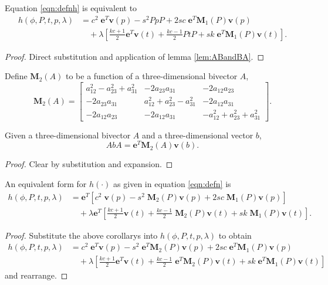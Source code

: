 \begin{cor}
Equation \ref{eqn:defnh} is equivalent to
\begin{align*}
h(\phi, P, t, p, \lambda) &= c^2\;\mathbf{e}^T\mathbf{v}(p) - s^2PpP + 2sc\;\mathbf{e}^T\mathbf{M}_1(P)\mathbf{v}(p) \\
&\quad+ \lambda\left[ 
 \frac{kc+1}{2} \mathbf{e}^T\mathbf{v}(t) + \frac{kc-1}{2} PtP
+ sk\;\mathbf{e}^T\mathbf{M}_1(P)\mathbf{v}(t)
\right].
\end{align*}
\begin{proof}
Direct substitution and application of lemma \ref{lem:ABandBA}.
\end{proof}
\end{cor}

\begin{definition}
Define $\mathbf{M}_2(A)$ to be a function of a three-dimensional bivector $A$,
\[
\mathbf{M}_2(A)  =
\left[
\begin{array}{ccc}
a^2_{12} - a^2_{23} + a^2_{31} &  - 2a_{23}a_{31} & - 2a_{12}a_{23} \\
- 2a_{23}a_{31} & a^2_{12} + a^2_{23} - a^2_{31} & - 2a_{12}a_{31}  \\
- 2a_{12}a_{23} & - 2a_{12}a_{31} &  -a^2_{12} + a^2_{23} + a^2_{31} 
\end{array}
\right].
\]
\end{definition}

\begin{cor}
Given a three-dimensional bivector $A$ and a three-dimensional vector $b$,
\[
AbA = \mathbf{e}^T \mathbf{M}_2(A) \mathbf{v}(b).
\]
\begin{proof}
Clear by substitution and expansion.
\end{proof}
\end{cor}

\begin{lemma}
\label{lem:finalh}
An equivalent form for $h(\cdot)$ as given in equation \ref{eqn:defn} is
\begin{align*}
h(\phi, P, t, p, \lambda) &= 
\mathbf{e}^T \left[ 
 c^2\;\mathbf{v}(p) - s^2\;\mathbf{M}_2(P)\mathbf{v}(p) + 2sc\;\mathbf{M}_1(P)\mathbf{v}(p) 
\right] \\
&\quad+ \lambda\mathbf{e}^T\left[ 
 \frac{kc+1}{2} \mathbf{v}(t) + \frac{kc-1}{2} \;\mathbf{M}_2(P)\mathbf{v}(t)
+ sk\;\mathbf{M}_1(P)\mathbf{v}(t)
 \right].
\end{align*}
\begin{proof}
Substitute the above corollarys into $h(\phi, P, t, p,\lambda)$ to obtain
\begin{align*}
h(\phi, P, t, p, \lambda) &= 
c^2\;\mathbf{e}^T\mathbf{v}(p) - s^2\;\mathbf{e}^T\mathbf{M}_2(P)\mathbf{v}(p) + 2sc\;\mathbf{e}^T\mathbf{M}_1(P)\mathbf{v}(p) \\
&\quad+ \lambda\left[ 
 \frac{kc+1}{2} \mathbf{e}^T\mathbf{v}(t) + \frac{kc-1}{2} \;\mathbf{e}^T\mathbf{M}_2(P)\mathbf{v}(t)
+ sk\;\mathbf{e}^T\mathbf{M}_1(P)\mathbf{v}(t)
 \right]
\end{align*}
and rearrange.
\end{proof}
\end{lemma}

